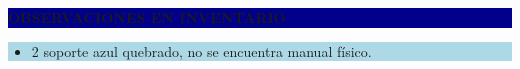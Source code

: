 \documentclass[11pt]{article}
\newcommand{\seccionbanda}[1]{%
  \vspace{0.6em}
  \noindent\colorbox{darkblue}{\parbox{\dimexpr\linewidth-2\fboxsep}{%
    \centering\color{white}\bfseries #1}}\par\vspace{0.6em}
}
\begin{document}
\seccionbanda{OBSERVACIONES EN INVENTARIO}
\noindent\colorbox{lightblue}{\parbox{\dimexpr\linewidth-2\fboxsep\relax}{%
\begin{itemize}[itemsep=4pt]
\item 2 soporte azul quebrado, no se encuentra manual físico.
\end{itemize}
}}\par
\end{document}
